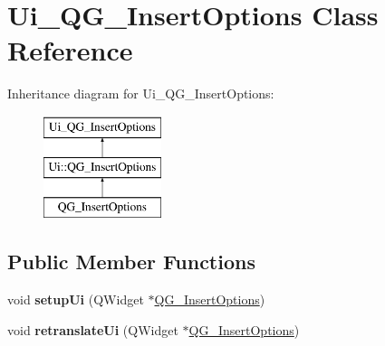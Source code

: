 \hypertarget{classUi__QG__InsertOptions}{\section{Ui\-\_\-\-Q\-G\-\_\-\-Insert\-Options Class Reference}
\label{classUi__QG__InsertOptions}
}
Inheritance diagram for Ui\-\_\-\-Q\-G\-\_\-\-Insert\-Options\-:\begin{figure}[H]
\begin{center}
\leavevmode
\includegraphics[height=3.000000cm]{classUi__QG__InsertOptions}
\end{center}
\end{figure}
\subsection*{Public Member Functions}
\begin{DoxyCompactItemize}
\item 
\hypertarget{classUi__QG__InsertOptions_a1c42e2e526165283bdd7e55421be1e99}{void {\bfseries setup\-Ui} (Q\-Widget $\ast$\hyperlink{classQG__InsertOptions}{Q\-G\-\_\-\-Insert\-Options})}\label{classUi__QG__InsertOptions_a1c42e2e526165283bdd7e55421be1e99}

\item 
\hypertarget{classUi__QG__InsertOptions_ad4a09ce04e7123b03705394357c64e7a}{void {\bfseries retranslate\-Ui} (Q\-Widget $\ast$\hyperlink{classQG__InsertOptions}{Q\-G\-\_\-\-Insert\-Options})}\label{classUi__QG__InsertOptions_ad4a09ce04e7123b03705394357c64e7a}

\end{DoxyCompactItemize}
